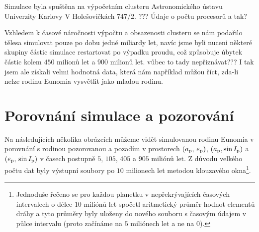 \documentclass[A4paper, 12pt, oneside]{book}
\begin{document}
Simulace byla spuštěna na výpočetním clusteru Astronomického ústavu Univerzity Karlovy V Holešovičkách 747/2. ??? Údaje o počtu procesorů a tak?

Vzhledem k časové náročnosti výpočtu a obsazenosti clusteru se nám podařilo tělesa simulovat pouze po dobu jedné miliardy let, navíc jsme byli nuceni některé skupiny částic simulace restartovat po výpadku proudu, což způsobuje úbytek částic kolem $450$ milionů let a $900$ milionů let. vůbec to tady nepřiznávat??? I tak jsem ale získali velmi hodnotná data, která nám například můžou říct, zda-li nelze rodinu Eunomia vysvětlit jako mladou rodinu.

\pagebreak
\section{Porovnání simulace a pozorování}

Na následujících několika obrázcích můžeme vidět simulovanou rodinu Eunomia v porovnání s rodinou pozorovanou a pozadím v prostorech $(a_{\rm p},\,e_{\rm p})$, $(a_{\rm p}, \sin I_{\rm p})$ a $(e_{\rm p},\,\sin I_{\rm p})$ v časech postupně $5$, $105$, $405$ a $905$ miliónů let. Z důvodu velkého počtu dat byly výstupní soubory  po $10$ milionech let metodou klouzavého okna\footnote{Jednoduše řečeno se pro každou planetku v nepřekrývajících časových intervalech o délce $10$ miliónů let spočetl aritmetický průměr hodnot elementů dráhy a tyto průměry byly uloženy do nového souboru s časovým údajem v půlce intervalu (proto začínáme na $5$ miliónech let a ne na $0$).}.
\end{document}
